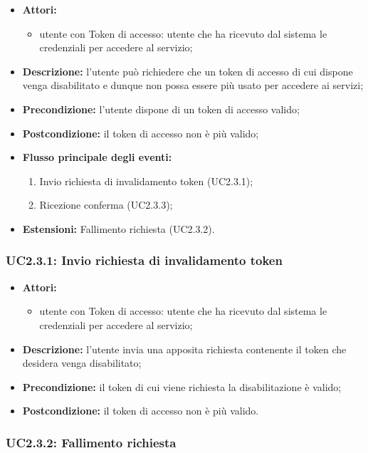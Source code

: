 \begin{itemize}
	\item \textbf{Attori:}
	\begin{itemize}
		\item utente con Token di accesso: utente che ha ricevuto dal sistema le credenziali per accedere al servizio;
	\end{itemize}
	\item \textbf{Descrizione:} l'utente può richiedere che un token di accesso di cui dispone venga disabilitato e dunque non possa essere più usato per accedere ai servizi;
	\item \textbf{Precondizione:} l'utente dispone di un token di accesso valido;
	\item \textbf{Postcondizione:} il token di accesso non è più valido;
	\item \textbf{Flusso principale degli eventi:}
	\begin{enumerate}
		\item Invio richiesta di invalidamento token (UC2.3.1);
		\item Ricezione conferma (UC2.3.3);
	\end{enumerate}
	\item \textbf{Estensioni:} Fallimento richiesta (UC2.3.2).
\end{itemize}


\subsubsection{UC2.3.1: Invio richiesta di invalidamento token}

\begin{itemize}
	\item \textbf{Attori:}
	\begin{itemize}
		\item utente con Token di accesso: utente che ha ricevuto dal sistema le credenziali per accedere al servizio;
	\end{itemize}
	\item \textbf{Descrizione:} l'utente invia una apposita richiesta contenente il token che desidera venga disabilitato;
	\item \textbf{Precondizione:} il token di cui viene richiesta la disabilitazione è valido;
	\item \textbf{Postcondizione:} il token di accesso non è più valido.
\end{itemize}

\subsubsection{UC2.3.2: Fallimento richiesta}

